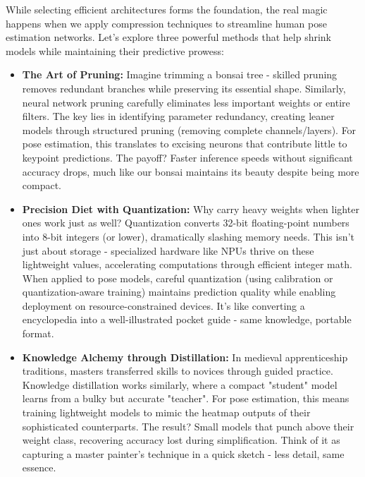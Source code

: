 While selecting efficient architectures forms the foundation, the real magic happens when we apply compression techniques to streamline human pose estimation networks. Let's explore three powerful methods that help shrink models while maintaining their predictive prowess:

\begin{itemize}
\item \textbf{The Art of Pruning:} Imagine trimming a bonsai tree - skilled pruning removes redundant branches while preserving its essential shape. Similarly, neural network pruning \citep{Han2016} carefully eliminates less important weights or entire filters. The key lies in identifying parameter redundancy, creating leaner models through structured pruning (removing complete channels/layers). For pose estimation, this translates to excising neurons that contribute little to keypoint predictions. The payoff? Faster inference speeds without significant accuracy drops, much like our bonsai maintains its beauty despite being more compact.

\item \textbf{Precision Diet with Quantization:} Why carry heavy weights when lighter ones work just as well? Quantization \citep{Jacob2018} converts 32-bit floating-point numbers into 8-bit integers (or lower), dramatically slashing memory needs. This isn't just about storage - specialized hardware like NPUs thrive on these lightweight values, accelerating computations through efficient integer math. When applied to pose models, careful quantization (using calibration or quantization-aware training) maintains prediction quality while enabling deployment on resource-constrained devices. It's like converting a encyclopedia into a well-illustrated pocket guide - same knowledge, portable format.

\item \textbf{Knowledge Alchemy through Distillation:} In medieval apprenticeship traditions, masters transferred skills to novices through guided practice. Knowledge distillation \citep{Hinton2015} works similarly, where a compact "student" model learns from a bulky but accurate "teacher". For pose estimation, this means training lightweight models to mimic the heatmap outputs of their sophisticated counterparts. The result? Small models that punch above their weight class, recovering accuracy lost during simplification. Think of it as capturing a master painter's technique in a quick sketch - less detail, same essence.
\end{itemize}

